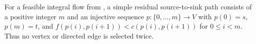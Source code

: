 \begin{definition}
For a feasible integral flow from , a simple
residual source-to-sink path consists of a positive integer $m$ and an
injective sequence $p:\{0,\ldots,m\}\to V$ with $p(0)=s$, $p(m)=t$,
and $f(p(i),p(i+1))<c(p(i),p(i+1))$ for $0\leq i<m$.
Thus no vertex or directed edge is selected twice.
\end{definition}
